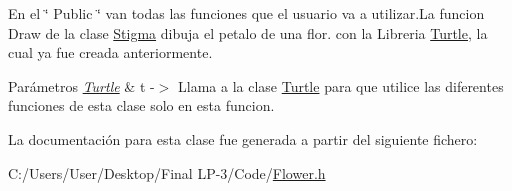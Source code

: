 En el \char`\"{} Public \char`\"{} van todas las funciones que el usuario va a utilizar.\+La funcion Draw de la clase \mbox{\hyperlink{class_stigma}{Stigma}} dibuja el petalo de una flor. con la Libreria \mbox{\hyperlink{class_turtle}{Turtle}}, la cual ya fue creada anteriormente.
\begin{DoxyParams}{Parámetros}
{\em \mbox{\hyperlink{class_turtle}{Turtle}}} & t -\/$>$ Llama a la clase \mbox{\hyperlink{class_turtle}{Turtle}} para que utilice las diferentes funciones de esta clase solo en esta funcion. \\
\hline
\end{DoxyParams}


La documentación para esta clase fue generada a partir del siguiente fichero\+:\begin{DoxyCompactItemize}
\item 
C\+:/\+Users/\+User/\+Desktop/\+Final L\+P-\/3/\+Code/\mbox{\hyperlink{_flower_8h}{Flower.\+h}}\end{DoxyCompactItemize}
